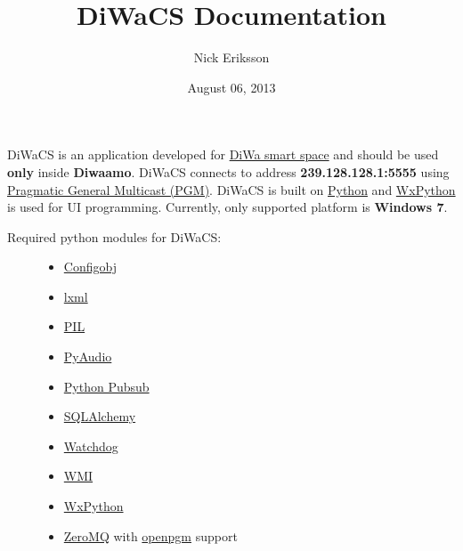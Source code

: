 \documentclass[letterpaper,10pt,english]{sphinxmanual}
\title{DiWaCS Documentation}
\date{August 06, 2013}
\author{Nick Eriksson}
\begin{document}
\maketitle
\tableofcontents
{}\label{index::doc}


DiWaCS is an application developed for \href{https://cse.aalto.fi/research/groups/stratus/research/research-projects/}{DiWa smart space}
and should be used \textbf{only} inside \textbf{Diwaamo}.
DiWaCS connects to address \textbf{239.128.128.1:5555} using \href{http://code.google.com/p/openpgm/}{Pragmatic General Multicast (PGM)}.
DiWaCS is built on \href{http://www.python.org}{Python} and \href{http://www.wxpython.org}{WxPython} is used for UI programming.
Currently, only supported platform is \textbf{Windows 7}.
\begin{description}
\item[{Required python modules for DiWaCS:}] \leavevmode\begin{itemize}
\item {} 
\href{http://www.voidspace.org.uk/python/configobj.html}{Configobj}

\item {} 
\href{http://pypi.python.org/pypi/lxml/}{lxml}

\item {} 
\href{http://www.pythonware.com/products/pil/}{PIL}

\item {} 
\href{http://pypi.python.org/pypi/PyAudio}{PyAudio}

\item {} 
\href{http://pubsub.sourceforge.net/}{Python Pubsub}

\item {} 
\href{http://www.sqlalchemy.org/}{SQLAlchemy}

\item {} 
\href{http://packages.python.org/watchdog/}{Watchdog}

\item {} 
\href{http://pypi.python.org/pypi/WMI/1.4.9/}{WMI}

\item {} 
\href{http://www.wxpython.org}{WxPython}

\item {} 
\href{http://zeromq.org}{ZeroMQ} with \href{http://code.google.com/p/openpgm/}{openpgm} support

\end{itemize}

\end{description}
\end{document}
